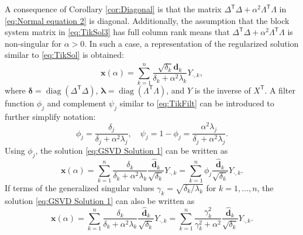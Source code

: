 \documentclass[12pt]{article}
\newcommand{\dVec}{\mathbf{d}}	%
\newcommand{\xVec}{\mathbf{x}}	%
\newcommand{\trans}[1]{{#1}^\mathsf{T}}	%
\DeclareMathOperator{\diag}{diag}	%
\newcommand{\regparam}{\alpha}
\newcommand{\filt}{\phi}
\newcommand{\mfilt}{\psi}
\newcommand{\svd}[1]{\widehat{#1}}	%
\begin{document}
A consequence of Corollary \ref{cor:Diagonal} is that the matrix $\trans{\Delta}\Delta + \regparam^2 \trans{\Lambda}\Lambda$ in \eqref{eq:Normal equation 2} is diagonal. Additionally, the assumption that the block system matrix in \eqref{eq:TikSol3} has full column rank means that $\trans{\Delta}\Delta + \regparam^2 \trans{\Lambda}\Lambda$ is non-singular for $\regparam > 0$. In such a case, a representation of the regularized solution similar to \eqref{eq:TikSol} is obtained:
\begin{equation}
\label{eq:GSVD Solution 1}
\xVec(\regparam) = \sum_{k = 1}^{n} \frac{\sqrt{\delta_k} \svd{\dVec}_k}{\delta_k + \regparam^2\lambda_k}Y_{\cdot,k},
\end{equation}
where $\bm{\delta} = \diag(\trans{\Delta}\Delta)$, $\bm{\lambda} = \diag(\trans{\Lambda}\Lambda)$, and $Y$ is the inverse of $\trans{X}$. A filter function $\filt_j$ and complement $\mfilt_j$ similar to \eqref{eq:TikFilt} can be introduced to further simplify notation:
\begin{equation}
\label{eq:Filter functions}
\filt_j = \frac{\delta_j}{\delta_j + \regparam^2 \lambda_j}, \quad \mfilt_j = 1 - \filt_j = \frac{\regparam^2 \lambda_j}{\delta_j + \regparam^2 \lambda_j}.
\end{equation}
Using $\filt_j$, the solution \eqref{eq:GSVD Solution 1} can be written as
\begin{equation}
\label{eq:GSVD Solution 2}
\xVec(\regparam) = \sum_{k = 1}^{n} \frac{\delta_k}{\delta_k + \regparam^2 \lambda_k} \frac{\svd{\dVec}_k}{\sqrt{\delta_k}} Y_{\cdot,k} = \sum_{k = 1}^{n} \filt_j \frac{\svd{\dVec}_k}{\sqrt{\delta_k}} Y_{\cdot,k}.
\end{equation} 
If terms of the generalized singular values $\gamma_k = \sqrt{\delta_k/\lambda_k}$ for $k = 1,\ldots,n$, the solution \eqref{eq:GSVD Solution 1} can also be written as
\begin{equation}
\label{eq:GSVD Solution 3}
\xVec(\regparam) = \sum_{k = 1}^{n} \frac{\delta_k}{\delta_k + \regparam^2 \lambda_k} \frac{\svd{\dVec}_k}{\sqrt{\delta_k}} Y_{\cdot,k} = \sum_{k = 1}^{n} \frac{\gamma_k^2}{\gamma_k^2 + \regparam^2} \frac{\svd{\dVec}_k}{\sqrt{\delta_k}} Y_{\cdot,k}.
\end{equation} 
\end{document}
